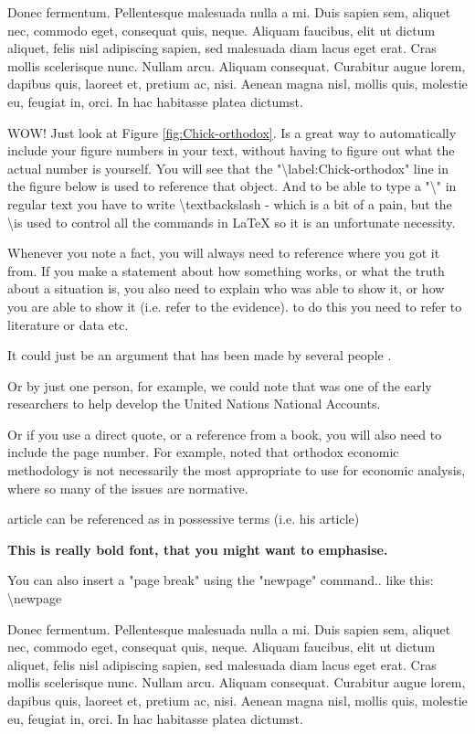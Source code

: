 \documentclass[english,a4paper,12pt]{article}
\makeatletter
\DeclareRobustCommand\citepos
  {\begingroup
   \let\NAT@nmfmt\NAT@posfmt%
   \NAT@swafalse\let\NAT@ctype\z@\NAT@partrue
   \@ifstar{\NAT@fulltrue\NAT@citetp}{\NAT@fullfalse\NAT@citetp}}
\let\NAT@orig@nmfmt\NAT@nmfmt
\def\NAT@posfmt#1{\NAT@orig@nmfmt{#1's}}
\makeatother
\begin{document}
Donec fermentum. Pellentesque malesuada nulla a mi. Duis sapien sem, aliquet nec, commodo eget, consequat quis, neque. Aliquam faucibus, elit ut dictum aliquet, felis nisl adipiscing sapien, sed malesuada diam lacus eget erat. Cras mollis scelerisque nunc. Nullam arcu. Aliquam consequat. Curabitur augue lorem, dapibus quis, laoreet et, pretium ac, nisi. Aenean magna nisl, mollis quis, molestie eu, feugiat in, orci. In hac habitasse platea dictumst.

WOW! Just look at Figure \ref{fig:Chick-orthodox}. Is a great way to automatically include your figure numbers in your text, without having to figure out what the actual number is yourself. You will see that the "\textbackslash label:Chick-orthodox" line in the figure below is used to reference that object. And to be able to type a "\textbackslash " in regular text you have to write \textbackslash textbackslash - which is a bit of a pain, but the \textbackslash is used to control all the commands in LaTeX so it is an unfortunate necessity.

Whenever you note a fact, you will always need to reference where you got it from. If you make a statement about how something works, or what the truth about a situation is, you also need to explain who was able to show it, or how you are able to show it (i.e. refer to the evidence). to do this you need to refer to literature or data etc.

It could just be an argument that has been made by several people \citep{bell2001role,wray2006}.

Or by just one person, for example, we could note that \citet{stone1966} was one of the early researchers to help develop the United Nations National Accounts.

Or if you use a direct quote, or a reference from a book, you will also need to include the page number. For example, \citet[p.~150]{chickdow2002} noted that orthodox economic methodology is not necessarily the most appropriate to use for economic analysis, where so many of the issues are normative.

\citepos{zezza2004circuit} article can be referenced as in possessive terms (i.e. his article)



\textbf{This is really bold font, that you might want to emphasise.}

You can also insert a "page break" using the "newpage" command.. like this: \textbackslash newpage

\newpage
Donec fermentum. Pellentesque malesuada nulla a mi. Duis sapien sem, aliquet nec, commodo eget, consequat quis, neque. Aliquam faucibus, elit ut dictum aliquet, felis nisl adipiscing sapien, sed malesuada diam lacus eget erat. Cras mollis scelerisque nunc. Nullam arcu. Aliquam consequat. Curabitur augue lorem, dapibus quis, laoreet et, pretium ac, nisi. Aenean magna nisl, mollis quis, molestie eu, feugiat in, orci. In hac habitasse platea dictumst.
\end{document}
